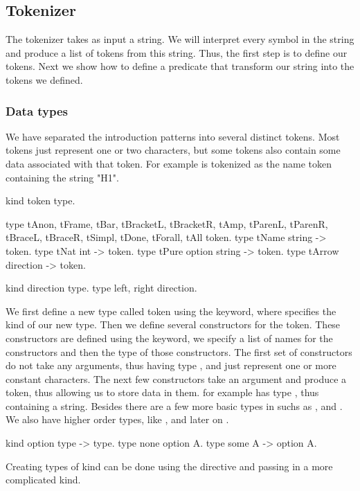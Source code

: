 \documentclass[thesis.tex]{subfiles}
\begin{document}
{{\subsection{Tokenizer}\label{ssec:tokenizer}
The tokenizer takes as input a string. We will interpret every symbol in the string and produce a list of tokens from this string. Thus, the first step is to define our tokens. Next we show how to define a predicate that transform our string into the tokens we defined.

\subsubsection{Data types}\label{sssec:datatypes}
We have separated the introduction patterns into several distinct tokens. Most tokens just represent one or two characters, but some tokens also contain some data associated with that token. For example  is tokenized as the name token containing the string "H1".
\begin{elpicode}
  kind token type.

  type tAnon, tFrame, tBar, tBracketL, tBracketR, tAmp,
       tParenL, tParenR, tBraceL, tBraceR, tSimpl,
       tDone, tForall, tAll token.
  type tName string -> token.
  type tNat int -> token.
  type tPure option string -> token.
  type tArrow direction -> token.

  kind direction type.
  type left, right direction.
\end{elpicode}
We first define a new type called token using the  keyword, where  specifies the kind of our new type. Then we define several constructors for the token. These constructors are defined using the  keyword, we specify a list of names for the constructors and then the type of those constructors. The first set of constructors do not take any arguments, thus having type , and just represent one or more constant characters. The next few constructors take an argument and produce a token, thus allowing us to store data in them.  for example has type , thus containing a string. Besides  there are a few more basic types in \elpi suchs as ,  and . We also have higher order types, like , and later on .
\begin{elpicode}
  kind option type -> type.
  type none option A.
  type some A -> option A.
\end{elpicode}
Creating types of kind  can be done using the  directive and passing in a more complicated kind.

}}
\end{document}
